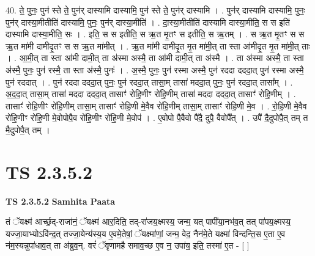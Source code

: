 \documentclass[17pt]{extarticle}
\begin{document}
40. ते॒ पुनः॒ पुन॑ स्ते ते॒ पुन॑र् दास्यामि दास्यामि॒ पुन॑ स्ते ते॒ पुन॑र् दास्यामि । . पुन॑र् दास्यामि दास्यामि॒ पुनः॒ पुन॑र् दास्या॒मीतीति॑ दास्यामि॒ पुनः॒ पुन॑र् दास्या॒मीति॑ । . दा॒स्या॒मीतीति॑ दास्यामि दास्या॒मीति॒ स स इति॑ दास्यामि दास्या॒मीति॒ सः । . इति॒ स स इतीति॒ स ऋ॒त मृ॒तꣳ स इतीति॒ स ऋ॒तम् । . स ऋ॒त मृ॒तꣳ स स ऋ॒त मा॑मी दामीदृ॒तꣳ स स ऋ॒त मा॑मीत् । . ऋ॒त मा॑मी दामीदृ॒त मृ॒त मा॑मी॒त् ता स्ता आ॑मीदृ॒त मृ॒त मा॑मी॒त् ताः । . आ॒मी॒त् ता स्ता आ॑मी दामी॒त् ता अ॑स्मा अस्मै॒ ता आ॑मी दामी॒त् ता अ॑स्मै । . ता अ॑स्मा अस्मै॒ ता स्ता अ॑स्मै॒ पुनः॒ पुन॑ रस्मै॒ ता स्ता अ॑स्मै॒ पुनः॑ । . अ॒स्मै॒ पुनः॒ पुन॑ रस्मा अस्मै॒ पुन॑ रददा दददा॒त् पुन॑ रस्मा अस्मै॒ पुन॑ रददात् । . पुन॑ रददा दददा॒त् पुनः॒ पुन॑ रददा॒त् तासा॒म् तासा॑ मददा॒त् पुनः॒ पुन॑ रददा॒त् तासा᳚म् । . अ॒द॒दा॒त् तासा॒म् तासा॑ मददा दददा॒त् तासाꣳ॑ रोहि॒णीꣳ रो॑हि॒णीम् तासा॑ मददा दददा॒त् तासाꣳ॑ रोहि॒णीम् । . तासाꣳ॑ रोहि॒णीꣳ रो॑हि॒णीम् तासा॒म् तासाꣳ॑ रोहि॒णी मे॒वैव रो॑हि॒णीम् तासा॒म् तासाꣳ॑ रोहि॒णी मे॒व । . रो॒हि॒णी मे॒वैव रो॑हि॒णीꣳ रो॑हि॒णी मे॒वोपोपै॒व रो॑हि॒णीꣳ रो॑हि॒णी मे॒वोप॑ । . ए॒वोपो पै॒वैवो पै॑दै॒ दुपै॒ वैवोपै᳚त् । . उपै॑ दै॒दुपोपै॒त् तम् त मै॒दुपोपै॒त् तम् । \newline
\pagebreak
{}
\section*{ TS 2.3.5.2 }

\textbf{TS 2.3.5.2 } \newline
\textbf{Samhita Paata} \newline

तं ॅयक्ष्म॑ आर्च्छ॒द्-राजा॑नं॒ ॅयक्ष्म॑ आर॒दिति॒ तद्-रा॑जय॒क्ष्मस्य॒ जन्म॒ यत् पापी॑या॒नभ॑व॒त् तत् पा॑पय॒क्ष्मस्य॒ यज्जा॒याभ्योऽवि॑न्द॒त् तज्जा॒येन्य॑स्य॒य ए॒वमे॒तेषां॒ ॅयक्ष्मा॑णां॒ जन्म॒ वेद॒ नैन॑मे॒ते यक्ष्मा॑ विन्दन्ति॒स ए॒ता ए॒व न॑म॒स्यन्नुपा॑धाव॒त् ता अ॑ब्रुव॒न्. वरं॑ ॅवृणामहै समाव॒च्छ ए॒व न॒ उपा॑य॒ इति॒ तस्मा॑ ए॒त - [  ] \newline
\end{document}
